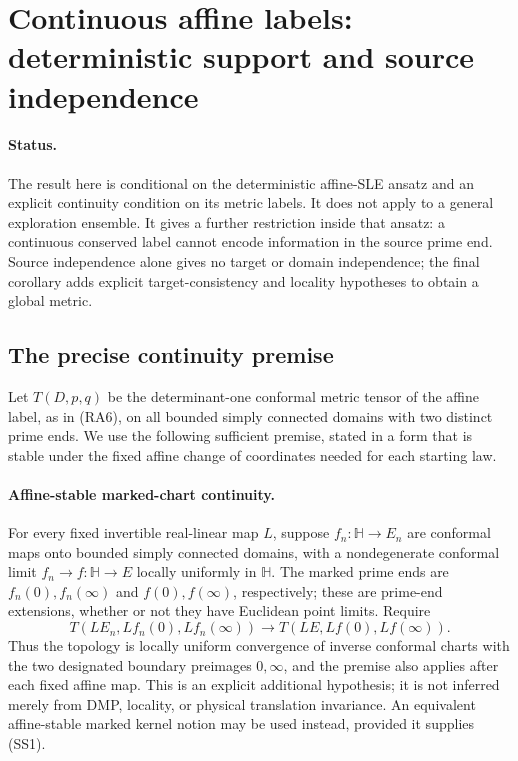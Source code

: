 \documentclass[11pt]{article}
\theoremstyle{definition}\newtheorem{definition}[theorem]{Definition}
\theoremstyle{remark}\newtheorem{remark}[theorem]{Remark}
\begin{document}
\section{Continuous affine labels: deterministic support and source independence}
\label{sec:support-source}

\paragraph{Status.}
The result here is conditional on the deterministic affine-SLE ansatz and an
explicit continuity condition on its metric labels.  It does not apply to a
general exploration ensemble.  It gives a further restriction inside that
ansatz: a continuous conserved label cannot encode information in the source
prime end.  Source independence alone gives no target or domain independence; the final corollary adds explicit target-consistency and locality hypotheses to obtain a global metric.

\subsection{The precise continuity premise}

Let $T(D,p,q)$ be the determinant-one conformal metric tensor of the affine
label, as in (RA6), on all bounded simply connected domains with two distinct
prime ends.  We use the following sufficient premise, stated in a form that
is stable under the fixed affine change of coordinates needed for each
starting law.

\paragraph{Affine-stable marked-chart continuity.}
For every fixed invertible real-linear map $L$, suppose
$f_n:\mathbb H\to E_n$ are conformal maps onto bounded simply connected
domains, with a nondegenerate conformal limit
$f_n\to f:\mathbb H\to E$ locally uniformly in $\mathbb H$.  The marked
prime ends are $f_n(0),f_n(\infty)$ and $f(0),f(\infty)$, respectively;
these are prime-end extensions, whether or not they have Euclidean point
limits.  Require
\[
 T(LE_n,Lf_n(0),Lf_n(\infty))
   \longrightarrow T(LE,Lf(0),Lf(\infty)).
 \tag{SS1}
\]
Thus the topology is locally uniform convergence of inverse conformal
charts with the two designated boundary preimages $0,\infty$, and the
premise also applies after each fixed affine map.  This is an explicit
additional hypothesis; it is not inferred merely from DMP, locality, or
physical translation invariance.  An equivalent affine-stable marked kernel
notion may be used instead, provided it supplies (SS1).
\end{document}
